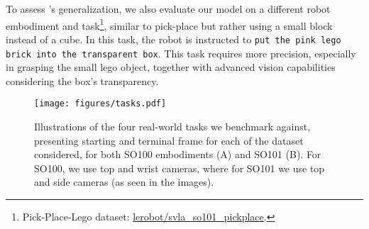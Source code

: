 To assess \ours's generalization, we also evaluate our model on a different robot embodiment and task\footnote{Pick-Place-Lego dataset: \href{https://huggingface.co/datasets/lerobot/svla_so101_pickplace}{lerobot/svla\_so101\_pickplace}.}, similar to pick-place but rather using a small block instead of a cube. 
In this task, the robot is instructed to \texttt{put the pink lego brick into the transparent box}. This task requires more precision, especially in grasping the small lego object, together with advanced vision capabilities considering the box's transparency.

\begin{figure}
    \centering
    \begin{minipage}[t]{0.99\textwidth}
        \centering
        \texttt{[image: figures/tasks.pdf]}
        \caption{Illustrations of the four real-world tasks we benchmark \ours against, presenting starting and terminal frame for each of the dataset considered, for both SO100 embodiments (A) and SO101 (B). For SO100, we use top and wrist cameras, where for SO101 we use top and side cameras (as seen in the images).}
        \label{fig:tasks}
    \end{minipage}
    \vspace{-0.6cm}
\end{figure}


